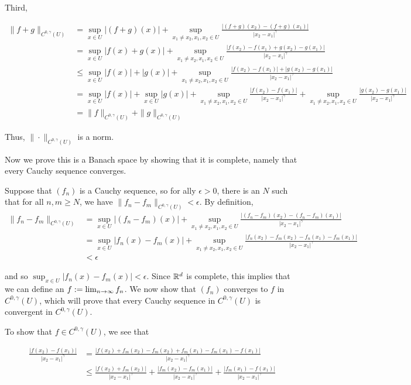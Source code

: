 \documentclass{hmwk}
\begin{document}
\begin{solution}
\pre Third, 

\begin{align*}
    \|f + g\|_{C^{0, \gamma}(U)} &= \sup_{x \in U}|(f + g)(x)| + \sup_{x_1 \neq x_2, x_1, x_2 \in U} \frac{|(f+g)(x_2) - (f + g)(x_1)|}{|x_2 - x_1|^\gamma} \\
    &= \sup_{x \in U}|f(x) + g(x)| + \sup_{x_1 \neq x_2, x_1, x_2 \in U} \frac{|f(x_2) - f(x_1) + g(x_2) - g(x_1)|}{|x_2 - x_1|^\gamma} \\
    &\leq \sup_{x \in U}|f(x)| + |g(x)| + \sup_{x_1 \neq x_2, x_1, x_2 \in U} \frac{|f(x_2) - f(x_1)| + |g(x_2) - g(x_1)|}{|x_2 - x_1|^\gamma} \\
    &= \sup_{x \in U}|f(x)| + \sup_{x\in U}|g(x)| + \sup_{x_1 \neq x_2, x_1, x_2 \in U} \frac{|f(x_2) - f(x_1)|}{|x_2 - x_1|^\gamma} + \sup_{x_1 \neq x_2, x_1, x_2 \in U} \frac{|g(x_2) - g(x_1)|}{|x_2 - x_1|^\gamma} \\
    &= \|f\|_{C^{0, \gamma}(U)} + \|g\|_{C^{0, \gamma}(U)}
\end{align*}

\pre Thus, $\|\cdot\|_{C^{0, \gamma}(U)}$ is a norm.

\pre Now we prove this is a Banach space by showing that it is complete, namely that every Cauchy sequence converges. 

\pre Suppose that $(f_n)$ is a Cauchy sequence, so for ally $\epsilon > 0$, there is an $N$ such that for all $n, m \geq N$, we have $\|f_n - f_m\|_{C^{0, \gamma}(U)} < \epsilon$. By definition, 
\begin{align*}
    \|f_n - f_m\|_{C^{0, \gamma}(U)} &= \sup_{x \in U} |(f_n - f_m)(x)| + \sup_{x_1 \neq x_2, x_1, x_2 \in U}\frac{|(f_n - f_m)(x_2) - (f_n - f_m)(x_1)|}{|x_2 - x_1|^\gamma} \\ 
    &= \sup_{x \in U} |f_n(x) - f_m(x)| + \sup_{x_1 \neq x_2, x_1, x_2 \in U}\frac{|f_n(x_2) - f_m(x_2) - f_n(x_1) - f_m(x_1)|}{|x_2 - x_1|^\gamma} \\
    &< \epsilon
\end{align*}

\pre and so $\sup_{x \in U} |f_n(x) - f_m(x)| < \epsilon$. Since $\mathbb{R}^d$ is complete, this implies that we can define an $f := \lim_{n\rightarrow\infty}f_n$. We now show that $(f_n)$ converges to $f$ in $C^{0, \gamma}(U)$, which will prove that every Cauchy sequence in $C^{0, \gamma}(U)$ is convergent in $C^{0, \gamma}(U)$.

\pre To show that $f \in C^{0, \gamma}(U)$, we see that

\begin{align*}
    \frac{|f(x_2) - f(x_1)|}{|x_2 - x_1|^\gamma} &= \frac{|f(x_2) + f_m(x_2) - f_m(x_2) + f_m(x_1) - f_m(x_1) - f(x_1)|}{|x_2 - x_1|^\gamma} \\
    &\leq \frac{|f(x_2) + f_m(x_2)|}{|x_2 - x_1|^\gamma} + \frac{|f_m(x_2) - f_m(x_1)|}{|x_2 - x_1|^\gamma} + \frac{|f_m(x_1) - f(x_1)|}{|x_2 - x_1|^\gamma} 
\end{align*}


\end{solution}
\end{document}
